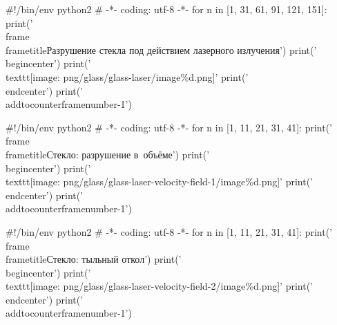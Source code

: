 \documentclass[xcolor={usenames,dvipsnames,svgnames,table}]{beamer}
\begin{document}
\begin{python}
#!/bin/env python2
# -*- coding: utf-8 -*-
for n in [1, 31, 61, 91, 121, 151]:
    print('\\frame{\\frametitle{Разрушение стекла под действием лазерного излучения}')
    print('\\begin{center}')
    print('\\texttt{[image: png/glass/glass-laser/image\%d.png]}' %
    print('\\end{center}}')
    print('\\addtocounter{framenumber}{-1}')
\end{python}

\addtocounter{framenumber}{+1}
\begin{python}
#!/bin/env python2
# -*- coding: utf-8 -*-
for n in [1, 11, 21, 31, 41]:
    print('\\frame{\\frametitle{Стекло: разрушение в~объёме}')
    print('\\begin{center}')
    print('\\texttt{[image: png/glass/glass-laser-velocity-field-1/image\%d.png]}' %
    print('\\end{center}}')
    print('\\addtocounter{framenumber}{-1}')
\end{python}

\addtocounter{framenumber}{+1}
\begin{python}
#!/bin/env python2
# -*- coding: utf-8 -*-
for n in [1, 11, 21, 31, 41]:
    print('\\frame{\\frametitle{Стекло: тыльный откол}')
    print('\\begin{center}')
    print('\\texttt{[image: png/glass/glass-laser-velocity-field-2/image\%d.png]}' %
    print('\\end{center}}')
    print('\\addtocounter{framenumber}{-1}')
\end{python}

\addtocounter{framenumber}{+1}
\end{document}
